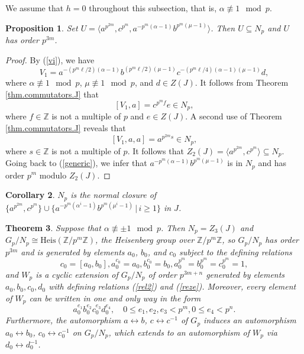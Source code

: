 \documentclass{amsart}
\newtheorem{theorem}{Theorem}[section]
\newtheorem{prop}[theorem]{Proposition}
\newtheorem{cor}[theorem]{Corollary}
\theoremstyle{definition}
\theoremstyle{remark}
\newcommand \Z{{\mathbb Z}}
\begin{document}
\medskip

 We assume that $h=0$ throughout this subsection, that is, $\alpha\not\equiv 1\mod p$.

\begin{prop}\label{h0z2} Set $U=\langle a^{p^{2m}}, c^{p^m}, a^{-p^m(\alpha-1)} b^{p^m(\mu-1)}\rangle$.
Then $U\subseteq N_p$ and $U$ has order $p^{3m}$.
\end{prop}

\begin{proof} By (\ref{vi}), we have
\begin{equation}
\label{generic}
V_1=a^{-(p^m\ell/2) (\alpha-1)} b^{(p^m\ell/2) (\mu-1)}c^{-(p^m \ell/4) (\alpha-1)(\mu-1)}d,
\end{equation}
where $\alpha\not\equiv 1\mod p$, $\mu\not\equiv 1\mod p$, and $d\in Z(J)$. It follows from Theorem \ref{thm.commutators.J} that
$$
[V_1,a]=c^{p^m f}e\in N_p,
$$
where $f\in\Z$ is not a multiple of $p$ and $e\in Z(J)$. A second use of Theorem \ref{thm.commutators.J} reveals that
$$
[V_1,a,a]=a^{p^{2m}s}\in N_p,
$$
where $s\in\Z$ is not a multiple of $p$. It follows that $Z_2(J)=\langle a^{p^{2m}}, c^{p^m}\rangle\subseteq N_p$.
Going back to (\ref{generic}), we infer that $a^{-p^m(\alpha-1)} b^{p^m(\mu-1)}$ is in $N_p$ and has order $p^m$
modulo $Z_2(J)$.
\end{proof}

\begin{cor}\label{clh0} $N_p$ is the normal closure of $\{a^{p^{2m}}, c^{p^m}\}\cup\{a^{-p^m(\alpha^i-1)} b^{p^m (\mu^i-1)}\,|\, i\geq 1\}$
in $J$.
\end{cor}

\begin{theorem}\label{hzero} Suppose that $\alpha\not\equiv \pm 1\mod p$. Then $N_p=Z_3(J)$ and
$G_p/N_p\cong\mathrm{Heis}(\Z/p^m\Z)$, the Heisenberg group over $\Z/p^m\Z$, so  $G_p/N_p$
has order $p^{3m}$ and is generated by elements
$a_0$, $b_0$, and $c_0$ subject to the defining
relations
\begin{equation}\label{reze}
c_0=[a_0,b_0], a_0^{c_0}=a_0, b_0^{c_0}=b_0, a_0^{p^{m}}=b_0^{p^{m}}=c_0^{p^{m}}=1,
\end{equation}
and $W_p$ is a cyclic extension of $G_p/N_p$ of order $p^{3m+n}$ generated by elements $a_0,b_0,c_0,d_0$
with defining relations (\ref{rel2}) and (\ref{reze}).  Moreover, every element of $W_p$ can be written in one and only way in the form
$$
a_0^{e_1} b_0^{e_2}c_0^{e_3}d_0^{e_4},\quad 0\leq e_1,e_2,e_3<p^{m}, 0\leq e_4<p^{n}.
$$
Furthermore, the automorphism $a\leftrightarrow b$, $c\leftrightarrow c^{-1}$ of $G_p$ induces an automorphism $a_0\leftrightarrow b_0$, 
$c_0\leftrightarrow c_0^{-1}$ on $G_p/N_p$, which extends to an automorphism of $W_p$ via $d_0\leftrightarrow d_0^{-1}$.

\end{theorem}
\end{document}
